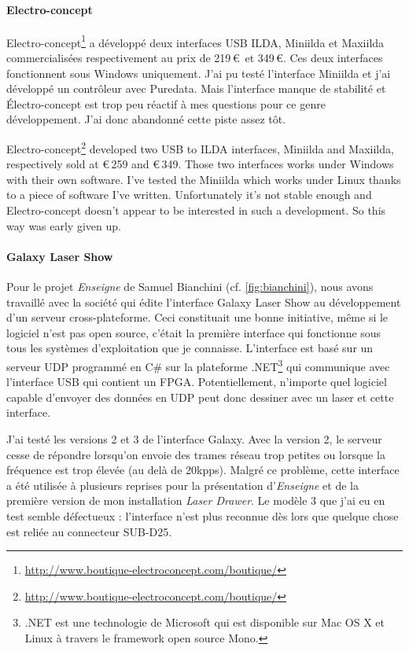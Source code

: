 \paragraph*{Electro-concept}
\begin{fr}
Electro-concept\footnote{\url{http://www.boutique-electroconcept.com/boutique/}} a développé deux interfaces USB ILDA, Miniilda et Maxiilda commercialisées respectivement au prix de 219\,\euro\ et 349\,\euro .
Ces deux interfaces fonctionnent sous Windows uniquement.
J'ai pu testé l'interface Miniilda et j'ai développé un contrôleur avec Puredata. 
Mais l'interface manque de stabilité et Électro-concept est trop peu réactif à mes questions pour ce genre développement.
J'ai donc abandonné cette piste assez tôt.
\end{fr}

\begin{en}
Electro-concept\footnote{\url{http://www.boutique-electroconcept.com/boutique/}} developed two USB to ILDA interfaces, Miniilda and Maxiilda, respectively sold at \euro\,259 and \euro\,349.
Those two interfaces works under Windows with their own software.
I've tested the Miniilda which works under Linux thanks to a piece of software I've written.
Unfortunately it's not stable enough and Electro-concept doesn't appear to be interested in such a development.
So this way was early given up.
\end{en}

\paragraph*{Galaxy Laser Show}
\begin{fr}
Pour le projet \textit{Enseigne} de Samuel Bianchini (cf. \ref{fig:bianchini}), nous avons travaillé avec la société qui édite l'interface Galaxy Laser Show au dévelop\-pement d'un serveur cross-plateforme.
Ceci constituait une bonne initiative, même si le logiciel n'est pas open source, c'était la première interface qui fonctionne sous tous les systèmes d'exploitation que je connaisse.
L'interface est basé sur un serveur UDP programmé en C\# sur la plateforme .NET\footnote{.NET est une technologie de Microsoft qui est disponible sur Mac OS X et Linux à travers le framework open source Mono.} qui communique avec l'interface USB qui contient un FPGA.
Potentiellement, n'importe quel logiciel capable d'envoyer des données en UDP peut donc dessiner avec un laser et cette interface.

J'ai testé les versions 2 et 3 de l'interface Galaxy.
Avec la version 2, le serveur cesse de répondre lorsqu'on envoie des trames réseau trop petites ou lorsque la fréquence est trop élevée (au delà de 20\unit{kpps}).
Malgré ce problème, cette interface a été utilisée à plusieurs reprises pour la présentation d'\textit{Enseigne} et de la première version de mon installation \textit{Laser Drawer}.
Le modèle 3 que j'ai eu en test semble défectueux : l'interface n'est plus reconnue dès lors que quelque chose est reliée au connecteur SUB-D25.
\end{fr}

